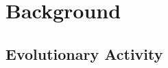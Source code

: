 \documentclass[letterpaper]{article}
\begin{document}


\section{Background}


\subsection{Evolutionary Activity}
\end{document}

